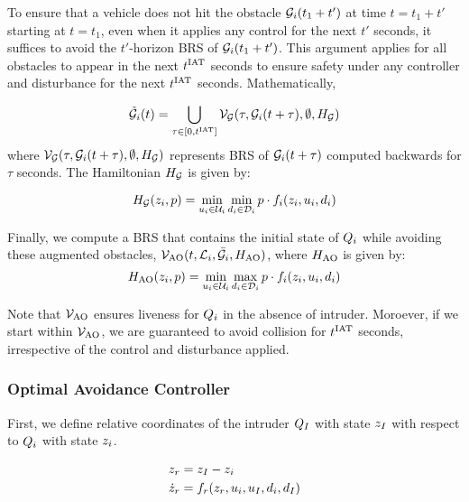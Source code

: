 To ensure that a vehicle does not hit the obstacle $\mathcal{G}_i(t_1 + t')$ at time $t = t_1 + t'$ starting at $t = t_1$, even when it applies any control for the next $t'$ seconds, it suffices to avoid the $t'$-horizon BRS of $\mathcal{G}_i(t_1 + t')$. This argument applies for all obstacles to appear in the next $t^\text{IAT}$ seconds to ensure safety under any controller and disturbance for the next $t^\text{IAT}$ seconds. Mathematically,

\begin{equation} \label{eqn:inducedobs}
\tilde\obsset_i(t) = \bigcup_{\tau \in [0, \iat]} \brs_{\mathcal{G}}(\tau, \obsset_i(t+\tau), \emptyset, \ham_{\mathcal{G}})
\end{equation}
where $\mathcal{V}_{\mathcal{G}}(\tau, \mathcal{G}_i(t+\tau), \emptyset, H_{\mathcal{G}})$ represents BRS of $\mathcal{G}_i(t+\tau)$ computed backwards for $\tau$ seconds. The Hamiltonian 
$H_{\mathcal{G}}$ is given by:

\begin{equation} \label{eqn:BRS_obsham}
\ham_{\mathcal{G}}(\state_i, p) = \min_{\ctrl_i \in \cset_i} \min_{\dstb_i \in \dset_i} p \cdot f_i (\state_i, \ctrl_i, \dstb_i)
\end{equation}

Finally, we compute a BRS that contains the initial state of $Q_i$ while avoiding these augmented obstacles, $\mathcal{V}_\text{AO}(t, \mathcal{L}_i, \bar{\mathcal{G}}_i, H_\text{AO})$, where $H_\text{AO}$ is given by:
\begin{equation} \label{eqn:BRSham}
\ham_\text{AO}(\state_i, p) = \min_{\ctrl_i \in \cset_i} \max_{\dstb_i \in \dset_i} p \cdot f_i (\state_i, \ctrl_i, \dstb_i)
\end{equation}

Note that $\mathcal{V}_\text{AO}$ ensures liveness for $Q_i$ in the absence of intruder. Moroever, if we start within $\mathcal{V}_\text{AO}$, we are guaranteed to avoid collision for $t^\text{IAT}$ seconds, irrespective of the control and disturbance applied. 

\subsubsection{Optimal Avoidance Controller \label{sec:intruder_avoid}}
First, we define relative coordinates of the intruder $Q_{I}$ with state $z_I$ with respect to $Q_i$ with state $z_i$.

\begin{equation}
\label{eq:reldyn}
\begin{aligned}
\state_r &= \state_\intr - \state_i \\
\dot \state_r &= f_r(\state_r, \ctrl_i, \ctrl_\intr, \dstb_i, \dstb_\intr)
\end{aligned}
\end{equation}

